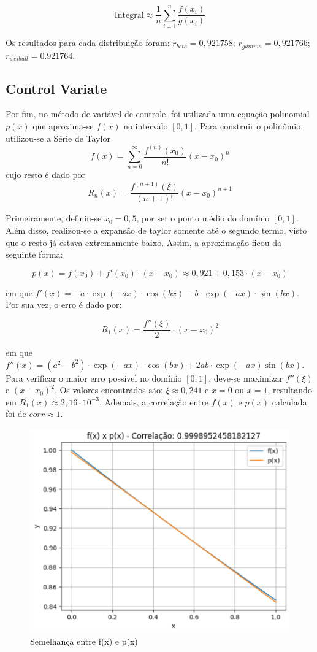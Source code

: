 \documentclass{article}
\begin{document}
  \[
  \text{Integral} \approx \frac{1}{n} \sum_{i=1}^{n} \frac{f(x_i)}{g(x_i)}
  \]

Os resultados para cada distribuição foram: $r_{beta} = 0,921758$; $r_{gamma} = 0,921766$; $r_{weibull} = 0.921764$.

\subsection{Control Variate}

Por fim, no método de variável de controle, foi utilizada uma equação polinomial $p(x)$ que aproxima-se $f(x)$ no intervalo $[0, 1]$. Para construir o polinômio, utilizou-se a Série de Taylor
\[
f(x) = \sum_{n=0}^{\infty} \frac{f^{(n)}(x_0)}{n!}(x - x_0)^n
\]
cujo resto é dado por
\[
R_n(x) = \frac{f^{(n+1)}(\xi)}{(n+1)!}(x - x_0)^{n+1}
\]

Primeiramente, definiu-se $x_0 = 0,5$, por ser o ponto médio do domínio $[0, 1]$. Além disso, realizou-se a expansão de taylor somente até o segundo termo, visto que o resto já estava extremamente baixo. Assim, a aproximação ficou da seguinte forma:

\[
p(x) = f(x_0) + f'(x_0)\cdot(x - x_0) \approx 0,921 + 0,153\cdot(x-x_0)
\]

em que $f'(x) = -a\cdot\exp(-ax)\cdot\cos(bx) - b\cdot\exp(-ax)\cdot\sin(bx)$. Por sua vez, o erro é dado por:

\[
R_1(x) = \frac{f''(\xi)}{2}\cdot(x - x_0)^2
\]

em que $f''(x) = (a^2 - b^2)\cdot\exp(-ax)\cdot\cos(bx) + 2ab\cdot\exp(-ax)\sin(bx)$. Para verificar o maior erro possível no domínio $[0, 1]$, deve-se maximizar $f''(\xi)$ e $(x-x_0)^2$. Os valores encontrados são: $\xi \approx 0,241$ e $x = 0$ ou $x = 1$, resultando em $R_1(x) \approx 2,16\cdot10^{-3}$. Ademais, a correlação entre $f(x)$ e $p(x)$ calculada foi de $corr\approx1$.

\begin{figure}[h]
\centering
\includegraphics[width=0.50\linewidth]{f(x) x p(x).png}
\caption{\label{fig:Gráfico 2} Semelhança entre f(x) e p(x)}
\end{figure}
\end{document}
